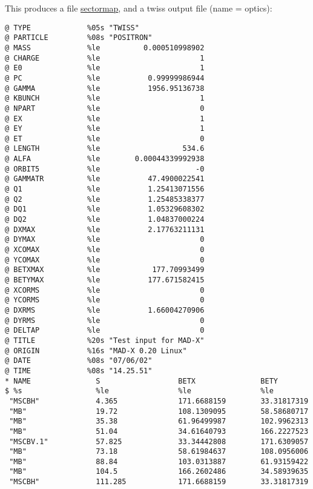 This produces a file \href{sectormap.html}{sectormap}, and a
twiss output file \label{tfs} (name = optics):  
\begin{verbatim}
@ TYPE             %05s "TWISS"
@ PARTICLE         %08s "POSITRON"
@ MASS             %le          0.000510998902
@ CHARGE           %le                       1
@ E0               %le                       1
@ PC               %le           0.99999986944
@ GAMMA            %le           1956.95136738
@ KBUNCH           %le                       1
@ NPART            %le                       0
@ EX               %le                       1
@ EY               %le                       1
@ ET               %le                       0
@ LENGTH           %le                   534.6
@ ALFA             %le        0.00044339992938
@ ORBIT5           %le                      -0
@ GAMMATR          %le           47.4900022541
@ Q1               %le           1.25413071556
@ Q2               %le           1.25485338377
@ DQ1              %le           1.05329608302
@ DQ2              %le           1.04837000224
@ DXMAX            %le           2.17763211131
@ DYMAX            %le                       0
@ XCOMAX           %le                       0
@ YCOMAX           %le                       0
@ BETXMAX          %le            177.70993499
@ BETYMAX          %le           177.671582415
@ XCORMS           %le                       0
@ YCORMS           %le                       0
@ DXRMS            %le           1.66004270906
@ DYRMS            %le                       0
@ DELTAP           %le                       0
@ TITLE            %20s "Test input for MAD-X"
@ ORIGIN           %16s "MAD-X 0.20 Linux"
@ DATE             %08s "07/06/02"
@ TIME             %08s "14.25.51"
* NAME               S                  BETX               BETY               
$ %s                 %le                %le                %le                
 "MSCBH"             4.365              171.6688159        33.31817319       
 "MB"                19.72              108.1309095        58.58680717       
 "MB"                35.38              61.96499987        102.9962313       
 "MB"                51.04              34.61640793        166.2227523       
 "MSCBV.1"           57.825             33.34442808        171.6309057       
 "MB"                73.18              58.61984637        108.0956006       
 "MB"                88.84              103.0313887        61.93159422       
 "MB"                104.5              166.2602486        34.58939635       
 "MSCBH"             111.285            171.6688159        33.31817319       

\end{verbatim}

